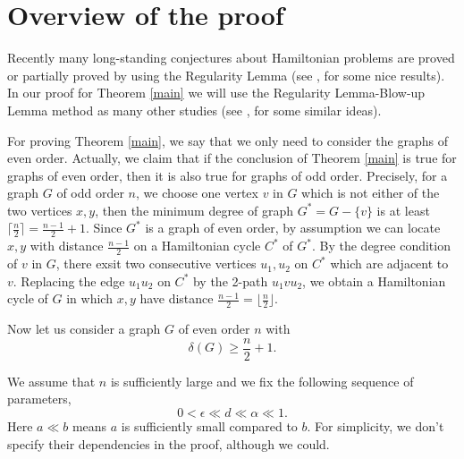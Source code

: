 \documentclass[11pt]{article}
\newtheorem{theorem}[lemma]{Theorem}
\begin{document}
%



\section{Overview of the proof}
Recently many long-standing conjectures about Hamiltonian problems are proved or partially proved by using the Regularity Lemma (see \cite{osthus}, \cite{seymourconj} for some nice results). In our proof for Theorem \ref{main} we will use the Regularity Lemma-Blow-up Lemma method as many other studies (see \cite{chen}, \cite{sarkozy} for some similar ideas).

For proving Theorem \ref{main}, we say that we only need to consider the graphs of even order. Actually, we claim that if the conclusion of Theorem \ref{main} is true for graphs of even order, then it is also true for graphs of odd order. Precisely, for a graph $G$ of odd order $n$, we choose one vertex $v$ in $G$ which is not either of the two vertices $x,y$, then the minimum degree of graph $G^*=G-\{v\}$ is at least $\lceil \frac{n}{2}\rceil=\frac{n-1}{2}+1$. Since $G^*$ is a graph of even order, by assumption we can locate $x,y$ with distance $\frac{n-1}{2}$ on a Hamiltonian cycle $C^*$ of $G^*$. By the degree condition of $v$ in $G$, there exsit two consecutive vertices $u_1,u_2$ on $C^*$ which are adjacent to $v$. Replacing the edge $u_1u_2$ on $C^*$ by the 2-path $u_1vu_2$, we obtain a Hamiltonian cycle of $G$ in which $x,y$ have distance $\frac{n-1}{2}=\lfloor \frac{n}{2}\rfloor$.

Now let us consider a graph $G$ of even order $n$ with
\begin{equation}\label{deg}
\delta (G)\geq \frac{n}{2}+1.
\end{equation}

We assume that $n$ is sufficiently large and we fix the following sequence of parameters,
\begin{equation}\label{para}
0<\epsilon \ll d\ll \alpha \ll1.
\end{equation}
Here $a \ll b$ means $a$ is sufficiently small compared to $b$. For simplicity, we don't specify their dependencies in the proof, although we could.
\end{document}
